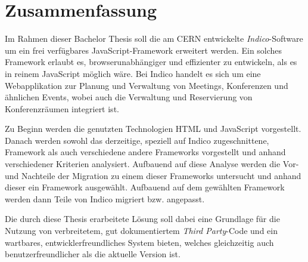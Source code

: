 \chapter*{Zusammenfassung}
\thispagestyle{empty}

Im Rahmen dieser Bachelor Thesis soll die am CERN entwickelte \emph{Indico}-Software um ein
frei verfügbares JavaScript-Framework erweitert werden. Ein solches Framework erlaubt es,
browserunabhängiger und effizienter zu entwickeln, als es in reinem JavaScript möglich wäre. Bei
Indico handelt es sich um eine Webapplikation zur Planung und Verwaltung von Meetings, Konferenzen
und ähnlichen Events, wobei auch die Verwaltung und Reservierung von Konferenzräumen integriert ist.

Zu Beginn werden die genutzten Technologien HTML und JavaScript vorgestellt. Danach werden sowohl
das derzeitige, speziell auf Indico zugeschnittene, Framework als auch verschiedene andere Frameworks
vorgestellt und anhand verschiedener Kriterien analysiert. Aufbauend auf diese Analyse werden die
Vor- und Nachteile der Migration zu einem dieser Frameworks untersucht und anhand dieser ein
Framework ausgewählt. Aufbauend auf dem gewählten Framework werden dann Teile von Indico migriert
bzw. angepasst.

Die durch diese Thesis erarbeitete Lösung soll dabei eine Grundlage für die Nutzung von
verbreitetem, gut dokumentiertem \emph{Third Party}-Code und ein wartbares, entwicklerfreundliches
System bieten, welches gleichzeitig auch benutzerfreundlicher als die aktuelle Version ist.
